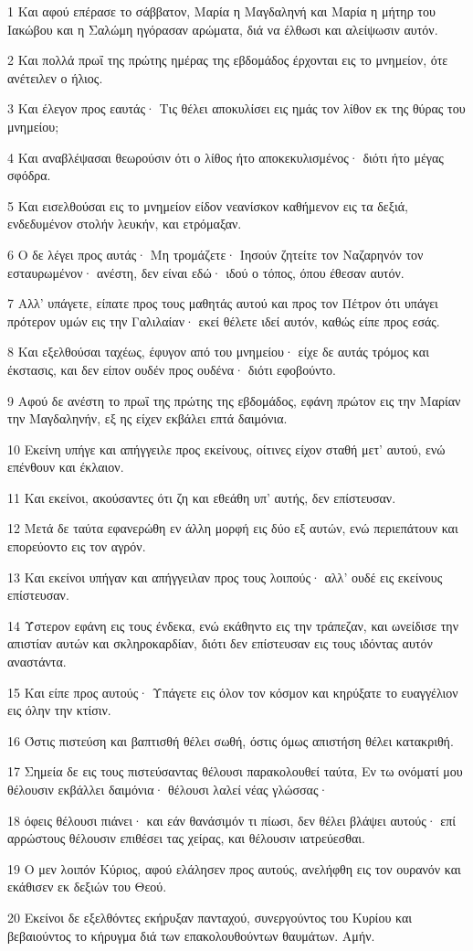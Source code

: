 \par 1 Και αφού επέρασε το σάββατον, Μαρία η Μαγδαληνή και Μαρία η μήτηρ του Ιακώβου και η Σαλώμη ηγόρασαν αρώματα, διά να έλθωσι και αλείψωσιν αυτόν.
\par 2 Και πολλά πρωΐ της πρώτης ημέρας της εβδομάδος έρχονται εις το μνημείον, ότε ανέτειλεν ο ήλιος.
\par 3 Και έλεγον προς εαυτάς· Τις θέλει αποκυλίσει εις ημάς τον λίθον εκ της θύρας του μνημείου;
\par 4 Και αναβλέψασαι θεωρούσιν ότι ο λίθος ήτο αποκεκυλισμένος· διότι ήτο μέγας σφόδρα.
\par 5 Και εισελθούσαι εις το μνημείον είδον νεανίσκον καθήμενον εις τα δεξιά, ενδεδυμένον στολήν λευκήν, και ετρόμαξαν.
\par 6 Ο δε λέγει προς αυτάς· Μη τρομάζετε· Ιησούν ζητείτε τον Ναζαρηνόν τον εσταυρωμένον· ανέστη, δεν είναι εδώ· ιδού ο τόπος, όπου έθεσαν αυτόν.
\par 7 Αλλ' υπάγετε, είπατε προς τους μαθητάς αυτού και προς τον Πέτρον ότι υπάγει πρότερον υμών εις την Γαλιλαίαν· εκεί θέλετε ιδεί αυτόν, καθώς είπε προς εσάς.
\par 8 Και εξελθούσαι ταχέως, έφυγον από του μνημείου· είχε δε αυτάς τρόμος και έκστασις, και δεν είπον ουδέν προς ουδένα· διότι εφοβούντο.
\par 9 Αφού δε ανέστη το πρωΐ της πρώτης της εβδομάδος, εφάνη πρώτον εις την Μαρίαν την Μαγδαληνήν, εξ ης είχεν εκβάλει επτά δαιμόνια.
\par 10 Εκείνη υπήγε και απήγγειλε προς εκείνους, οίτινες είχον σταθή μετ' αυτού, ενώ επένθουν και έκλαιον.
\par 11 Και εκείνοι, ακούσαντες ότι ζη και εθεάθη υπ' αυτής, δεν επίστευσαν.
\par 12 Μετά δε ταύτα εφανερώθη εν άλλη μορφή εις δύο εξ αυτών, ενώ περιεπάτουν και επορεύοντο εις τον αγρόν.
\par 13 Και εκείνοι υπήγαν και απήγγειλαν προς τους λοιπούς· αλλ' ουδέ εις εκείνους επίστευσαν.
\par 14 Ύστερον εφάνη εις τους ένδεκα, ενώ εκάθηντο εις την τράπεζαν, και ωνείδισε την απιστίαν αυτών και σκληροκαρδίαν, διότι δεν επίστευσαν εις τους ιδόντας αυτόν αναστάντα.
\par 15 Και είπε προς αυτούς· Υπάγετε εις όλον τον κόσμον και κηρύξατε το ευαγγέλιον εις όλην την κτίσιν.
\par 16 Όστις πιστεύση και βαπτισθή θέλει σωθή, όστις όμως απιστήση θέλει κατακριθή.
\par 17 Σημεία δε εις τους πιστεύσαντας θέλουσι παρακολουθεί ταύτα, Εν τω ονόματί μου θέλουσιν εκβάλλει δαιμόνια· θέλουσι λαλεί νέας γλώσσας·
\par 18 όφεις θέλουσι πιάνει· και εάν θανάσιμόν τι πίωσι, δεν θέλει βλάψει αυτούς· επί αρρώστους θέλουσιν επιθέσει τας χείρας, και θέλουσιν ιατρεύεσθαι.
\par 19 Ο μεν λοιπόν Κύριος, αφού ελάλησεν προς αυτούς, ανελήφθη εις τον ουρανόν και εκάθισεν εκ δεξιών του Θεού.
\par 20 Εκείνοι δε εξελθόντες εκήρυξαν πανταχού, συνεργούντος του Κυρίου και βεβαιούντος το κήρυγμα διά των επακολουθούντων θαυμάτων. Αμήν.


